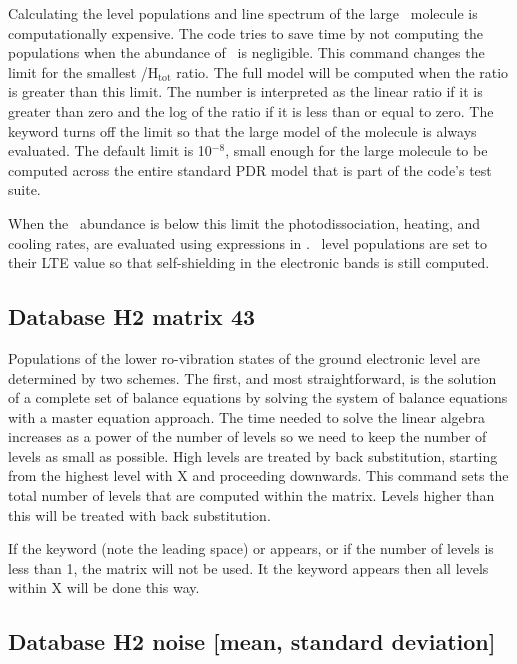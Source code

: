 Calculating the level populations and line spectrum of the large \htwo\ molecule is computationally expensive.
The code tries to save time by not
computing the populations when the abundance of \htwo\ is negligible.  This
command changes the limit for the smallest \htwo/H$_{\mathrm{tot}}$ ratio.
The full model
will be computed when the ratio is greater than this limit.
The number
is interpreted as the linear ratio if it is greater than zero and the log
of the ratio if it is less than or equal to zero.
The keyword
 turns
off the limit so that the large model of the molecule is always evaluated.
The default limit is 10$^{-8}$, small enough for the large molecule to be
computed across the entire \citet{Tielens1985a} standard PDR
model that is part of the code's test suite.

When the \htwo\ abundance is below this limit the photodissociation,
heating, and cooling rates, are evaluated using expressions in
\citet{Tielens1985a}.
\htwo\ level populations are set to their LTE value so that
self-shielding in the electronic bands is still computed.

\subsection{Database H2 matrix 43}

Populations of the lower ro-vibration states of the ground electronic
level are determined by two schemes.
The first, and most straightforward,
is the solution of a complete set of balance equations by solving
the system
of balance equations with a master equation approach.
The time needed to solve the linear
algebra increases as a power of the number of levels
so we need to keep
the number of levels as small as possible.
High levels are treated by back
substitution, starting from the highest level with X and proceeding
downwards.
This command sets the total number of levels that are computed
within the matrix.
Levels higher than this will be treated with back
substitution.

If the keyword  (note the leading space) or
 appears, or if the
number of levels is less than 1, the matrix will not be used.
It the keyword
 appears then all levels within X will be done this way.

\subsection{Database H2 noise [mean, standard deviation]}

